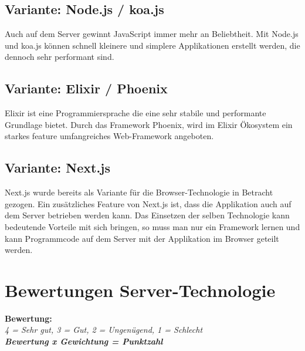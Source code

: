 \subsection{Variante: Node.js / koa.js}

Auch auf dem Server gewinnt JavaScript immer mehr an Beliebtheit.
Mit Node.js und koa.js können schnell kleinere und simplere Applikationen
erstellt werden, die dennoch sehr performant sind.

\subsection{Variante: Elixir / Phoenix}

Elixir ist eine Programmiersprache die eine sehr stabile und performante Grundlage
bietet. Durch das Framework Phoenix, wird im Elixir Ökosystem ein starkes feature
umfangreiches Web-Framework angeboten.

\subsection{Variante: Next.js}

Next.js wurde bereits als Variante für die Browser-Technologie in Betracht
gezogen. Ein zusätzliches Feature von Next.js ist, dass die Applikation auch
auf dem Server betrieben werden kann.
Das Einsetzen der selben Technologie kann bedeutende Vorteile mit sich bringen,
so muss man nur ein Framework lernen und kann Programmcode auf dem Server mit
der Applikation im Browser geteilt werden.

\clearpage
\section{Bewertungen Server-Technologie}\label{bewertungen-server-technologie}

\textbf{Bewertung:}\\
\textit{4 = Sehr gut, 3 = Gut, 2 = Ungenügend, 1 = Schlecht}\\


\textbf{\textit{Bewertung x Gewichtung = Punktzahl}}

